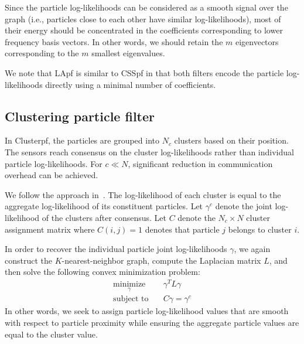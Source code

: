\documentclass[10pt,letterpaper,final]{article}
\begin{document}
Since the particle log-likelihoods can be considered as a smooth signal over the graph (i.e., particles close to each other have similar log-likelihoods), most of their energy should be concentrated in the coefficients corresponding to lower frequency basis vectors. In other words, we should retain the $m$ eigenvectors corresponding to the $m$ smallest eigenvalues. 

We note that LApf is similar to CSSpf in that both filters encode the particle log-likelihoods directly using a minimal number of coefficients. 


\subsection{Clustering particle filter}
\label{sec:evaluation}
In Clusterpf, the particles are grouped into $N_c$ clusters based on their position. The sensors reach consensus on the cluster log-likelihoods rather than individual particle log-likelihoods. For $c \ll N$, significant reduction in communication overhead can be achieved. 

We follow the approach in~\cite{Hlinka2012}. The log-likelihood of each cluster is equal to the aggregate log-likelihood of its constituent particles. Let $\gamma^c$ denote the joint log-likelihood of the clusters after consensus. Let $C$ denote the $N_c \times N$ cluster assignment matrix where $C(i,j)=1$ denotes that particle $j$ belongs to cluster $i$. 

In order to recover the individual particle joint log-likelihoods $\gamma$, we again construct the $K$-nearest-neighbor graph, compute the Laplacian matrix $L$, and then solve the following convex minimization problem:
\begin{align*}
\underset{\gamma}{\text{minimize}}& \quad \gamma^TL\gamma  \\
\text{subject to}& \quad C\gamma = \gamma^c
\end{align*}
In other words, we seek to assign particle log-likelihood values that are smooth with respect to particle proximity while ensuring the aggregate particle values are equal to the cluster value. 

\end{document}

